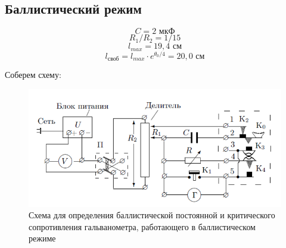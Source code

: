 \documentclass[a4paper, 12pt]{article}
\begin{document}
\subsection*{Баллистический режим}

$$C = 2 \text{ мкФ}$$
$$R_1/R_2 = 1/15$$
$$l_{max} = 19,4 \text{ см}$$
$$l_{\text{своб}} = l_{max} \cdot e^{\theta_0/4}=20,0 \text{ см}$$

Соберем схему:

\begin {figure}[H]
	\begin{center}
		\includegraphics[width = 0.8 \textwidth]{Scheme2}
		\caption{Схема для определения баллистической постоянной и критического сопротивления гальванометра, работающего в баллистическом режиме}
	\end{center}
\end {figure}

\end{document}
